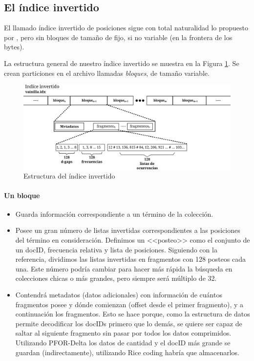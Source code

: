 \subsection{El índice invertido}

El llamado índice invertido de posiciones sigue con total naturalidad lo propuesto por \cite{Zhang:2008}, pero sin bloques de tamaño de fijo, si no variable (en la frontera de los bytes).

La estructura general de nuestro índice invertido se muestra en la Figura \ref{fig:indice}. Se crean particiones en el archivo llamadas \textit{bloques}, de tamaño variable. 

\begin{figure}[h]
\centering
    \includegraphics[scale=0.9]{./Images/estructura_1.png}
\caption{Estructura del índice invertido}
\label{fig:indice}
\end{figure}


\paragraph{Un bloque}

\begin{itemize}
\item Guarda información correspondiente a un término de la colección.

\item Posee un gran número de listas invertidas correspondientes a las posiciones del término en consideración. Definimos un <<posteo>> como el conjunto de un docID, frecuencia relativa y lista de posiciones. Siguiendo con la referencia, dividimos las listas invertidas en fragmentos con 128 posteos cada una. Este número podría cambiar para hacer más rápida la búsqueda en colecciones chicas o más grandes, pero siempre será múltiplo de 32.

\item Contendrá metadatos (datos adicionales) con información de cuántos fragmentos posee y dónde comienzan (offset desde el primer fragmento), y a continuación los fragmentos. Esto se hace porque, como la estructura de datos permite decodificar los docIDs primero que lo demás, se quiere ser capaz de saltar al siguiente fragmento sin pasar por todos los datos comprimidos. Utilizando PFOR-Delta los datos de cantidad y el docID más grande se guardan (indirectamente), utilizando Rice coding habría que almacenarlos.
\end{itemize}

